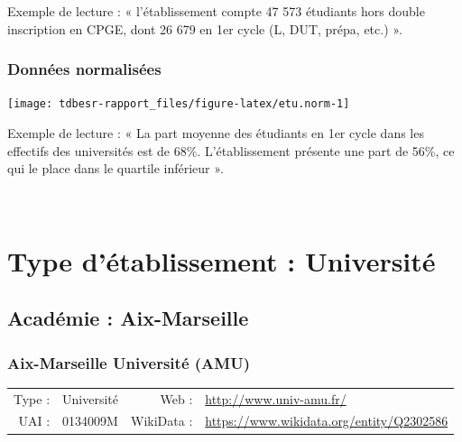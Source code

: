 \documentclass[12pt,french,]{article}
\begin{document}
Exemple de lecture : « l'établissement compte 47 573 étudiants hors
double inscription en CPGE, dont 26 679 en 1er cycle (L, DUT, prépa,
etc.) ».

\hypertarget{donnuxe9es-normalisuxe9es}{%
\subsubsection{Données normalisées}\label{donnuxe9es-normalisuxe9es}}

\begin{center}\texttt{[image: tdbesr-rapport\_files/figure-latex/etu.norm-1]} \end{center}

Exemple de lecture : « La part moyenne des étudiants en 1er cycle dans
les effectifs des universités est de 68\%. L'établissement présente une
part de 56\%, ce qui le place dans le quartile inférieur ».


\newpage
\footnotesize

\checkoddpage

\ifoddpage \fi ~\newpage  

\hypertarget{type-duxe9tablissement-universituxe9}{%
\section{Type d'établissement :
Université}\label{type-duxe9tablissement-universituxe9}}

\hypertarget{acaduxe9mie-aix-marseille}{%
\subsection{Académie : Aix-Marseille}\label{acaduxe9mie-aix-marseille}}

\hypertarget{aix-marseille-universituxe9-amu}{%
\subsubsection{Aix-Marseille Université
(AMU)}\label{aix-marseille-universituxe9-amu}}

\begin{tabular*}{\textwidth}{rp{5cm}rl}  
\hline  
Type : & Université & Web : &\href{http://www.univ-amu.fr/}{http://www.univ-amu.fr/} \\  
UAI : & 0134009M & WikiData : & \href{https://www.wikidata.org/entity/Q2302586}{https://www.wikidata.org/entity/Q2302586} \\  
\hline  
\end{tabular*}
\end{document}

